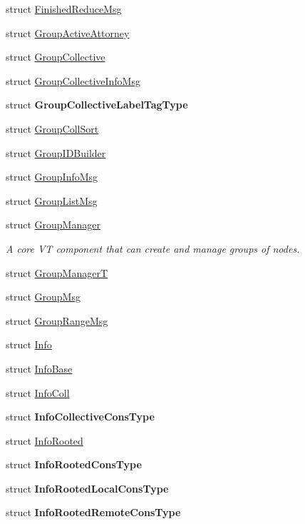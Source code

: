 \begin{DoxyCompactItemize}
\item 
struct \hyperlink{structvt_1_1group_1_1_finished_reduce_msg}{Finished\+Reduce\+Msg}
\item 
struct \hyperlink{structvt_1_1group_1_1_group_active_attorney}{Group\+Active\+Attorney}
\item 
struct \hyperlink{structvt_1_1group_1_1_group_collective}{Group\+Collective}
\item 
struct \hyperlink{structvt_1_1group_1_1_group_collective_info_msg}{Group\+Collective\+Info\+Msg}
\item 
struct {\bfseries Group\+Collective\+Label\+Tag\+Type}
\item 
struct \hyperlink{structvt_1_1group_1_1_group_coll_sort}{Group\+Coll\+Sort}
\item 
struct \hyperlink{structvt_1_1group_1_1_group_i_d_builder}{Group\+I\+D\+Builder}
\item 
struct \hyperlink{structvt_1_1group_1_1_group_info_msg}{Group\+Info\+Msg}
\item 
struct \hyperlink{structvt_1_1group_1_1_group_list_msg}{Group\+List\+Msg}
\item 
struct \hyperlink{structvt_1_1group_1_1_group_manager}{Group\+Manager}
\begin{DoxyCompactList}\small\item\em A core VT component that can create and manage groups of nodes. \end{DoxyCompactList}\item 
struct \hyperlink{structvt_1_1group_1_1_group_manager_t}{Group\+ManagerT}
\item 
struct \hyperlink{structvt_1_1group_1_1_group_msg}{Group\+Msg}
\item 
struct \hyperlink{structvt_1_1group_1_1_group_range_msg}{Group\+Range\+Msg}
\item 
struct \hyperlink{structvt_1_1group_1_1_info}{Info}
\item 
struct \hyperlink{structvt_1_1group_1_1_info_base}{Info\+Base}
\item 
struct \hyperlink{structvt_1_1group_1_1_info_coll}{Info\+Coll}
\item 
struct {\bfseries Info\+Collective\+Cons\+Type}
\item 
struct \hyperlink{structvt_1_1group_1_1_info_rooted}{Info\+Rooted}
\item 
struct {\bfseries Info\+Rooted\+Cons\+Type}
\item 
struct {\bfseries Info\+Rooted\+Local\+Cons\+Type}
\item 
struct {\bfseries Info\+Rooted\+Remote\+Cons\+Type}
\end{DoxyCompactItemize}
